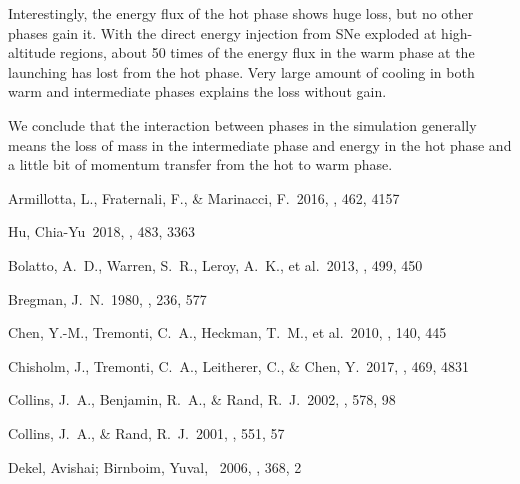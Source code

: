 \documentclass[twocolumn]{aastex62}
\begin{document}
\begin{enumerate}
    Interestingly, the energy flux of the hot phase shows huge loss, but no other phases gain it. With the direct energy injection from SNe exploded at high-altitude regions, about 50 times of the energy flux in the warm phase at the launching has lost from the hot phase. Very large amount of cooling in both warm and intermediate phases explains the loss without gain. 
    
    We conclude that the interaction between phases in the simulation generally means the loss of mass in the intermediate phase and energy in the hot phase and a little bit of momentum transfer from the hot to warm phase.
\end{enumerate}

\begin{thebibliography}{999}

 Armillotta, L., Fraternali, F., \& Marinacci, F.\ 2016, \mnras, 462, 4157 

 Hu, Chia-Yu\ 2018, \mnras, 483, 3363 

 Bolatto, A.~D., Warren, S.~R., Leroy, A.~K., et al.\ 2013, \nat, 499, 450 


 Bregman, J.~N.\ 1980, \apj, 236, 577 

 Chen, Y.-M., Tremonti, C.~A., Heckman, T.~M., et al.\ 2010, \aj, 140, 445 

 Chisholm, J., Tremonti, C.~A., Leitherer, C., \& Chen, Y.\ 2017, \mnras, 469, 4831 

 Collins, J.~A., Benjamin, R.~A., \& Rand, R.~J.\ 2002, \apj, 578, 98 

 Collins, J.~A., \& Rand, R.~J.\ 2001, \apj, 551, 57 

 Dekel, Avishai; Birnboim, Yuval, \ 2006, \mnras, 368, 2 



\end{thebibliography}
\end{document}
